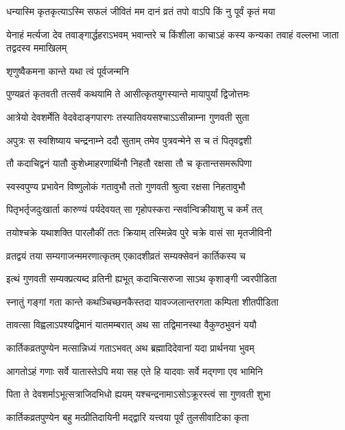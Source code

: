 \twolineshloka
{धन्यास्मि कृतकृत्याऽस्मि सफलं जीवितं मम}
{दानं व्रतं तपो वाऽपि किं नु पूर्वं कृतं मया} %

\threelineshloka
{येनाहं मर्त्यजा देव तवाङ्गार्द्धहराऽभवम्}
{भवान्तरे च किंशीला काचाऽहं कस्य कन्यका}
{तवाहं वल्लभा जाता तद्वदस्व ममाखिलम्} %



\onelineshloka
{शृणुष्वैकमना कान्ते यथा त्वं पूर्वजन्मनि} %

\twolineshloka
{पुण्यव्रतं कृतवती तत्सर्वं कथयामि ते}
{आसीत्कृतयुगस्यान्ते मायापुर्यां द्विजोत्तमः} %

\twolineshloka
{आत्रेयो देवशर्मेति वेदवेदाङ्गपारगः}
{तस्यातिवयसश्चाऽऽसीन्नाम्ना गुणवती सुता} %

\twolineshloka
{अपुत्रः स स्वशिष्याय चन्द्रनाम्ने ददौ सुताम्}
{तमेव पुत्रवन्मेने स च तं पितृवद्वशी} %

\twolineshloka
{तौ कदाचिद्वनं यातौ कुशेध्माहरणार्थिनौ}
{निहतौ रक्षसा तौ च कृतान्तसमरूपिणा} %

\twolineshloka
{स्वस्वपुण्य प्रभावेन विष्णुलोकं गतावुभौ}
{ततो गुणवती श्रुत्वा रक्षसा निहतावुभौ} %

\twolineshloka
{पितृभर्तृजदुःखार्ता कारुण्यं पर्यदेवयत्}
{सा गृहोपस्करा न्सर्वान्विक्रीयाशु च कर्मं तत्} %

\twolineshloka
{तयोश्चक्रे यथाशक्ति पारलौकीं ततः क्रियाम्}
{तस्मिन्नेव पुरे चक्रे वासं सा मृतजीविनी} %

\twolineshloka
{व्रतद्वयं तया सम्यगाजन्ममरणात्कृतम्}
{एकादशीव्रतं सम्यक्सेवनं कार्तिकस्य च} %

\twolineshloka
{इत्थं गुणवती सम्यक्प्रत्यब्द व्रतिनी ह्यभूत्}
{कदाचित्सरुजा साऽथ कृशाङ्गी ज्वरपीडिता} %

\twolineshloka
{स्नातुं गङ्गां गता कान्ते कथञ्चिच्छनकैस्तदा}
{यावज्जलान्तरगता कम्पिता शीतपीडिता} %

\twolineshloka
{तावत्सा विह्वलाऽपश्यद्विमानं यातमम्बरात्}
{अथ सा तद्विमानस्था वैकुण्ठभुवनं ययौ} %

\twolineshloka
{कार्तिकव्रतपुण्येन मत्सान्निध्यं गताऽभवत्}
{अथ ब्रह्मादिदेवानां यदा प्रार्थनया भुवम्} %

\twolineshloka
{आगतोऽहं गणाः सर्वे यातास्तेऽपि मया सह}
{एते हि यादवाः सर्वे मद्गणा एव भामिनि} %

\twolineshloka
{पिता ते देवशर्माऽभूत्सत्राजिदभिधो ह्ययम्}
{यश्चन्द्रनामाऽसोऽक्रूरस्त्वं सा गुणवती शुभा} %

\twolineshloka
{कार्तिकव्रतपुण्येन बहु मत्प्रीतिदायिनी}
{मद्द्वारि यत्त्वया पूर्वं तुलसीवाटिका कृता} %

